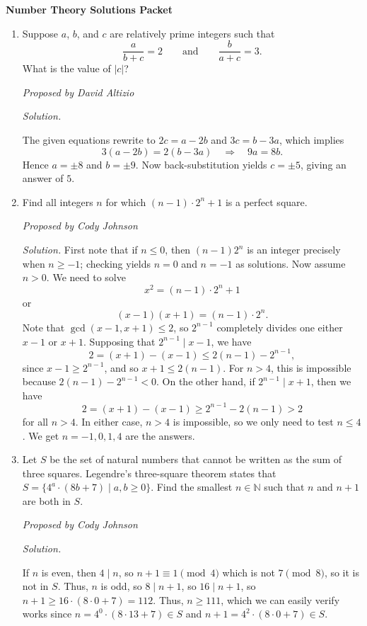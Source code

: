 \documentclass[10pt]{article}
\newcommand{\proposed}[1]
{
\vspace{5pt}
\noindent\textit{Proposed by #1}
}
\newcommand{\solution}
{
\vspace{5pt}
\noindent\textit{Solution.}\qquad
}
\begin{document}
\begin{center}
\huge\textbf{Number Theory Solutions Packet}\normalsize

\vspace{3pt}
\end{center}

\begin{enumerate}
\item Suppose $a$, $b$, and $c$ are relatively prime integers such that \[\frac{a}{b+c} = 2\qquad\text{and}\qquad \frac{b}{a+c} = 3.\] What is the value of $|c|$?

\proposed{David Altizio}

\solution
The given equations rewrite to $2c = a-2b$ and $3c = b-3a$, which implies \[3(a-2b) = 2(b-3a)\quad\Rightarrow\quad 9a = 8b.\] Hence $a=\pm 8$ and $b=\pm 9$.  Now back-substitution yields $c=\pm 5$, giving an answer of $\boxed 5$.

\item Find all integers $n$ for which $(n-1)\cdot 2^n + 1$ is a perfect square.

\proposed{Cody Johnson}

\solution First note that if $n\leq 0$, then $(n-1)2^n$ is an integer precisely when $n\geq -1$; checking yields $n=0$ and $n=-1$ as solutions.  Now assume $n > 0$.  We need to solve \[x^2=(n-1)\cdot2^n+1\] or \[(x-1)(x+1)=(n-1)\cdot2^n.\] Note that $\gcd(x-1,x+1)\le2$, so $2^{n-1}$ completely divides one either $x-1$ or $x+1$. Supposing that $2^{n-1}\mid x-1$, we have \[2=(x+1)-(x-1)\le2(n-1)-2^{n-1},\] since $x-1 \geq 2^{n-1}$, and so $x+1 \leq 2(n-1)$. For $n > 4$, this is impossible because $2(n-1) - 2^{n-1} < 0$. On the other hand, if $2^{n-1}\mid x+1$, then we have \[2=(x+1)-(x-1)\ge2^{n-1}-2(n-1) > 2\] for all $n> 4$. In either case, $n > 4$ is impossible, so we only need to test $n\le4$. We get $n=\boxed{-1,0,1,4}$ are the answers.

\item Let $S$ be the set of natural numbers that cannot be written as the sum of three squares. Legendre's three-square theorem states that $S=\{4^a\cdot(8b+7)\mid a,b\ge0\}.$ Find the smallest $n\in\mathbb N$ such that $n$ and $n+1$ are both in $S$.

\proposed{Cody Johnson}

\solution
If $n$ is even, then $4\mid n$, so $n+1\equiv1\pmod4$ which is not $7\pmod8$, so it is not in $S$. Thus, $n$ is odd, so $8\mid n+1$, so $16\mid n+1$, so $n+1\ge16\cdot(8\cdot0+7)=112$. Thus, $n\ge\boxed{111}$, which we can easily verify works since $n=4^0\cdot(8\cdot13+7)\in S$ and $n+1=4^2\cdot(8\cdot0+7)\in S$.



\end{enumerate}
\end{document}
